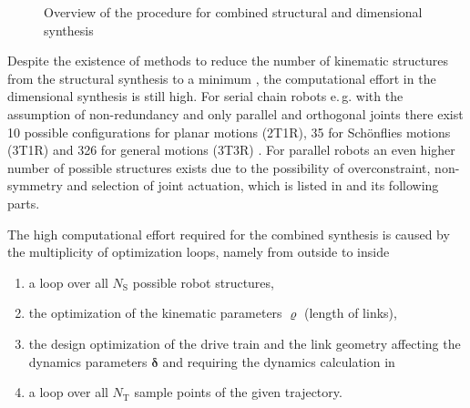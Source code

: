 \documentclass{svproc}
\newcommand{\bm}[1]{\boldsymbol{#1}}
\begin{document}
\begin{figure}[tb]
	
	\caption{Overview of the procedure for combined structural and dimensional synthesis}
	\label{fig:structdimsynth}
\end{figure} 


Despite the existence of methods to reduce the number of kinematic structures from the structural synthesis to a minimum \cite{RamirezKotOrt2015}, the computational effort in the dimensional synthesis is still high.
For serial chain robots e.\,g. with the assumption of non-redundancy and only parallel and orthogonal joints there exist 10 possible configurations for planar motions (2T1R), 35 for Schönflies motions (3T1R) and 326 for general motions (3T3R) \cite{RamirezKotOrt2015,RamirezKotOrt2017}.
For parallel robots an even higher number of possible structures exists due to the possibility of overconstraint, non-symmetry and selection of joint actuation, which is listed in \cite{Gogu2008} and its following parts.

The high computational effort required for the combined synthesis is caused by the multiplicity of optimization loops, namely from outside to inside
\begin{enumerate}
\item a loop over all $N_{\mathrm{S}}$ possible robot structures,
\item the optimization of the kinematic parameters $\bm{\varrho}$ (length of links),
\item the design optimization of the drive train and the link geometry affecting the dynamics parameters $\bm{\delta}$ and requiring the dynamics calculation in 
\item a loop over all $N_\mathrm{T}$ sample points of the given trajectory.
\end{enumerate}
\end{document}
